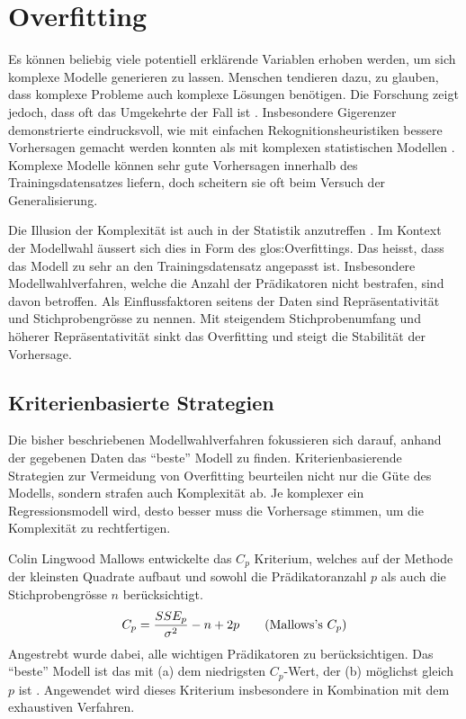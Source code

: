 \section{Overfitting}
Es können beliebig viele potentiell erklärende Variablen erhoben werden, um sich komplexe Modelle generieren zu lassen. 
Menschen tendieren dazu, zu glauben, dass komplexe Probleme auch komplexe Lösungen benötigen. 
Die Forschung zeigt jedoch, dass oft das Umgekehrte der Fall ist \cite[p.3]{armstrong2011illusions}. 
Insbesondere Gigerenzer demonstrierte eindrucksvoll, wie mit einfachen Rekognitionsheuristiken bessere Vorhersagen gemacht werden konnten als mit komplexen statistischen Modellen \cite{borges1999can}.
Komplexe Modelle können sehr gute Vorhersagen innerhalb des Trainingsdatensatzes liefern, doch scheitern sie oft beim Versuch der Generalisierung.  

Die Illusion der Komplexität ist auch in der Statistik anzutreffen \cite[p. 3]{armstrong2011illusions}. 
Im Kontext der Modellwahl äussert sich dies in Form des  \Gls{glos:Overfitting}s. Das heisst, dass das Modell zu sehr an den Trainingsdatensatz angepasst ist.
Insbesondere Modellwahlverfahren, welche die Anzahl der Prädikatoren nicht bestrafen, sind davon betroffen.
Als Einflussfaktoren seitens der Daten sind Repräsentativität und Stichprobengrösse zu nennen. 
Mit steigendem Stichprobenumfang und höherer Repräsentativität sinkt das Overfitting und steigt die Stabilität der Vorhersage.

\subsection{Kriterienbasierte Strategien}
Die bisher beschriebenen Modellwahlverfahren fokussieren sich darauf, anhand der gegebenen Daten das ``beste'' Modell zu finden.
Kriterienbasierende Strategien zur Vermeidung von Overfitting beurteilen nicht nur die Güte des Modells, sondern strafen auch Komplexität ab.
Je komplexer ein Regressionsmodell wird, desto besser muss die Vorhersage stimmen, um die Komplexität zu rechtfertigen.

Colin Lingwood Mallows entwickelte das $C_p$ Kriterium, welches auf der Methode der kleinsten Quadrate  aufbaut und sowohl die Prädikatoranzahl $p$ als auch die Stichprobengrösse $n$ berücksichtigt. 
\begin{equation}
C_p={SSE_p \over \sigma^2} - n + 2p
\tag{Mallows's $C_p$}
\end{equation}
Angestrebt wurde dabei, alle wichtigen Prädikatoren zu berücksichtigen. 
Das ``beste'' Modell ist das mit (a) dem niedrigsten $C_p$-Wert, der (b) möglichst gleich $p$ ist \cite{gilmour1996interpretation}. Angewendet wird dieses Kriterium insbesondere in Kombination mit dem exhaustiven Verfahren.

